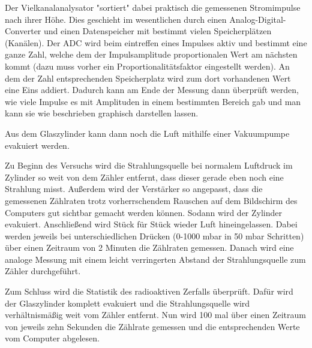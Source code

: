 Der Vielkanalanalysator "sortiert" dabei praktisch die gemessenen Stromimpulse nach ihrer Höhe.
Dies geschieht im wesentlichen durch einen Analog-Digital-Converter und einen Datenspeicher mit bestimmt vielen
Speicherplätzen (Kanälen). Der ADC wird beim eintreffen eines Impulses aktiv und bestimmt eine ganze Zahl, welche
dem der Impulsamplitude proportionalen Wert am nächsten kommt (dazu muss vorher ein Proportionalitätsfaktor eingestellt
werden). An dem der Zahl entsprechenden Speicherplatz wird zum dort vorhandenen Wert eine Eins addiert. Dadurch
kann am Ende der Messung dann überprüft werden, wie viele Impulse es mit Amplituden in einem bestimmten Bereich gab und man
kann sie wie beschrieben graphisch darstellen lassen.

Aus dem Glaszylinder kann dann noch die Luft mithilfe einer Vakuumpumpe evakuiert werden.

Zu Beginn des Versuchs wird die Strahlungsquelle bei normalem Luftdruck im Zylinder so weit
von dem Zähler entfernt, dass dieser gerade eben noch eine Strahlung misst. Außerdem wird
der Verstärker so angepasst, dass die gemessenen Zählraten trotz vorherrschendem Rauschen auf
dem Bildschirm des Computers gut sichtbar gemacht werden können. Sodann wird
der Zylinder evakuiert. Anschließend wird Stück für Stück wieder Luft hineingelassen.
Dabei werden jeweils bei unterschiedlichen Drücken (0-1000 mbar in 50 mbar Schritten)
über einen Zeitraum von 2 Minuten die Zählraten gemessen.
Danach wird eine analoge Messung mit einem leicht verringerten Abstand der Strahlungsquelle
zum Zähler durchgeführt.

Zum Schluss wird die Statistik des radioaktiven Zerfalls überprüft. Dafür wird der
Glaszylinder komplett evakuiert und die Strahlungsquelle wird verhältnismäßig weit vom
Zähler entfernt. Nun wird 100 mal über einen Zeitraum von jeweils zehn Sekunden die
Zählrate gemessen und die entsprechenden Werte vom Computer abgelesen.
